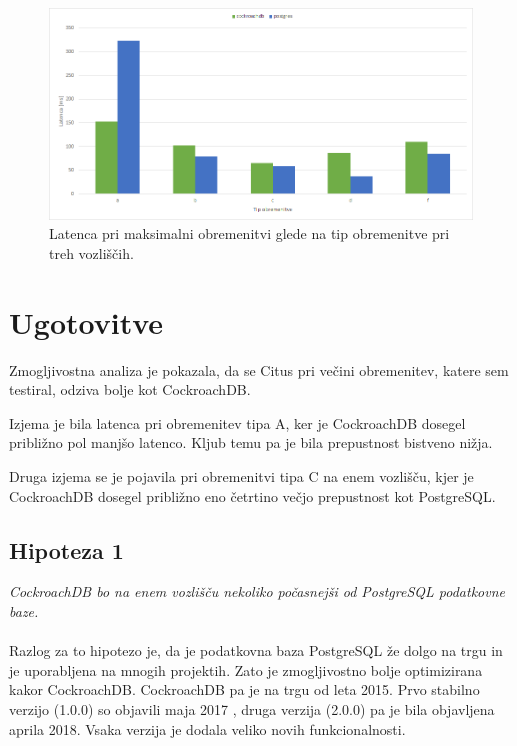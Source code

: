\documentclass[a4paper, 12pt]{book}
\begin{document}
\begin{figure}[H]
\begin{center}
\includegraphics[width=1\textwidth]{resources/maxThroughput-latency-n3-v2.png}
\end{center}
\caption{Latenca pri maksimalni obremenitvi glede na tip obremenitve pri treh vozliščih.}
\label{img_ycsb_results_max_throughput_latency_n3}
\end{figure}

\section{Ugotovitve}
Zmogljivostna analiza je pokazala, da se Citus pri večini obremenitev, katere sem testiral, odziva bolje kot CockroachDB.

Izjema je bila latenca pri obremenitev tipa A, ker je CockroachDB dosegel približno pol manjšo latenco. Kljub temu pa je bila prepustnost bistveno nižja.

Druga izjema se je pojavila pri obremenitvi tipa C na enem vozlišču, kjer je CockroachDB dosegel približno eno četrtino večjo prepustnost kot PostgreSQL.

\subsection{Hipoteza 1}
\textit{CockroachDB bo na enem vozlišču nekoliko počasnejši od PostgreSQL podatkovne baze.}\\\\Razlog za to hipotezo je, da je podatkovna baza PostgreSQL že dolgo na trgu \cite{Postgres-first-release} in je uporabljena na mnogih projektih. Zato je zmogljivostno bolje optimizirana kakor CockroachDB. CockroachDB pa je na trgu od leta 2015. Prvo stabilno verzijo (1.0.0) so objavili maja 2017 \cite{CRDB-2017}, druga verzija (2.0.0) pa je bila objavljena aprila 2018. Vsaka verzija je dodala veliko novih funkcionalnosti.
\end{document}
